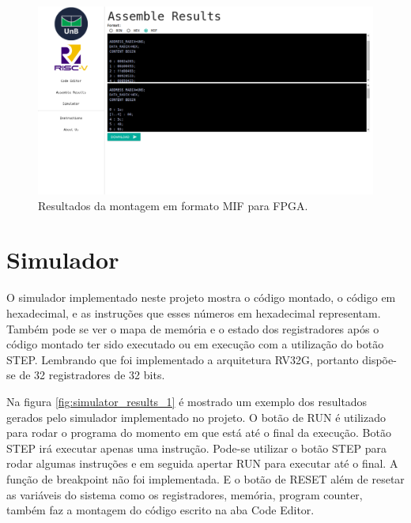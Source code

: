 	\begin{figure}[h]
	  \includegraphics[width=\linewidth]{img/assemble_data_mif.png}
	  \caption{Resultados da montagem em formato MIF para FPGA.}
	  \label{fig:assemble_data_mif}
	\end{figure}



\section{Simulador}

	O simulador implementado neste projeto mostra o código montado, o código em hexadecimal, e as instruções que esses números em hexadecimal representam. Também pode se ver o mapa de memória e o estado dos registradores após o código montado ter sido executado ou em execução com a utilização do botão STEP.  Lembrando que foi implementado a arquitetura RV32G, portanto dispõe-se de 32 registradores de 32 bits.

	Na figura \ref{fig:simulator_results_1} é mostrado um exemplo dos resultados gerados pelo simulador implementado no projeto. O botão de RUN é utilizado para rodar o programa do momento em que está até o final da execução. Botão STEP irá executar apenas uma instrução. Pode-se utilizar o botão STEP para rodar algumas instruções e em seguida apertar RUN para executar até o final. A função de breakpoint não foi implementada. E o botão de RESET além de resetar as variáveis do sistema como os registradores, memória, program counter, também faz a montagem do código escrito na aba Code Editor.


